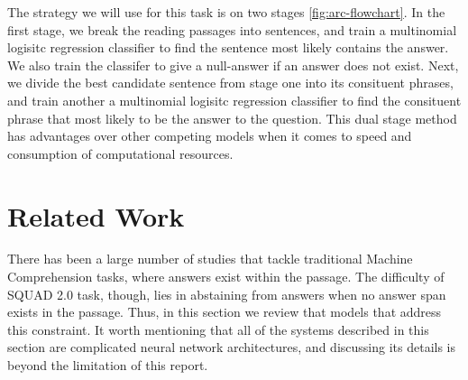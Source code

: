 The strategy we will use for this task is on two stages \ref{fig:arc-flowchart}. In the first stage, we break the reading passages into sentences, and train a multinomial logisitc regression classifier to find the sentence most likely contains the answer. We also train the classifer to give a null-answer if an answer does not exist. Next, we divide the best candidate sentence from stage one into its consituent phrases, and train another a multinomial logisitc regression classifier to find the consituent phrase that most likely to be the answer to the question. This dual stage method has advantages over other competing models when it comes to speed and consumption of computational resources. 




\section{Related Work}

There has been a large number of studies that tackle traditional Machine Comprehension tasks, where answers exist within the passage. The difficulty of SQUAD 2.0 task, though, lies in abstaining from answers when no answer span exists in the passage. Thus, in this section we review that models that address this constraint. It worth mentioning that all of the systems described in this section are complicated neural network architectures, and discussing its details is beyond the limitation of this report. 

